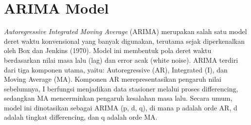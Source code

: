 \section{ARIMA Model} 
\textit{Autoregressive Integrated Moving Average} (ARIMA) merupakan salah satu model deret waktu konvensional yang banyak digunakan, terutama sejak diperkenalkan oleh Box dan Jenkins (1970). 
Model ini membentuk pola deret waktu berdasarkan nilai masa lalu (lag) dan error acak (white noise)\citep{rathod2017forecasting}. 
ARIMA terdiri dari tiga komponen utama, yaitu: Autoregressive (AR), Integrated (I), dan Moving Average (MA). 
Komponen AR merepresentasikan pengaruh nilai sebelumnya, I berfungsi menjadikan data stasioner melalui proses differencing, sedangkan MA mencerminkan pengaruh kesalahan masa lalu. 
Secara umum, model ini dinotasikan sebagai ARIMA (p, d, q), di mana p adalah orde AR, d adalah tingkat differencing, dan q adalah orde MA.

